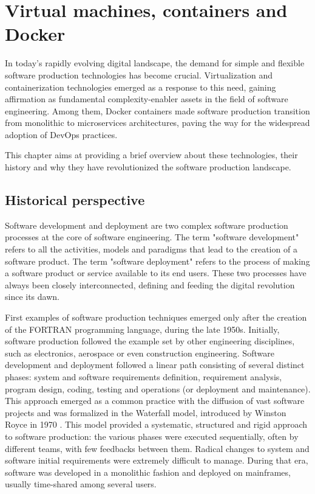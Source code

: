 \chapter{Virtual machines, containers and Docker}

In today's rapidly evolving digital landscape, the demand for simple and flexible software production technologies has become crucial. 
Virtualization and containerization technologies emerged as a response to this need, gaining affirmation as fundamental complexity-enabler assets in the field of software engineering.
Among them, Docker containers made software production transition from monolithic to microservices architectures, paving the way for the widespread adoption of DevOps practices. 

This chapter aims at providing a brief overview about these technologies, their history and why they have revolutionized the software production landscape.

\newpage

\section{Historical perspective}

Software development and deployment are two complex software production processes at the core of software engineering. 
The term "software development" refers to all the activities, models and paradigms that lead to the creation of a software product. The term "software deployment" refers to the process of making a software product or service available to its end users.
These two processes have always been closely interconnected, defining and feeding the digital revolution since its dawn.

First examples of software production techniques emerged only after the creation of the FORTRAN programming language, during the late 1950s.   
Initially, software production followed the example set by other engineering disciplines, such as electronics, aerospace or even construction engineering. 
Software development and deployment followed a linear path consisting of several distinct phases: system and software requirements definition, requirement analysis, program design, coding, testing and operations (or deployment and maintenance).
This approach emerged as a common practice with the diffusion of vast software projects and was formalized in the Waterfall model, introduced by Winston Royce in 1970 \cite{royce1987managing}.
This model provided a systematic, structured and rigid approach to software production: the various phases were executed sequentially, often by different teams, with few feedbacks between them. Radical changes to system and software initial requirements were extremely difficult to manage.
During that era, software was developed in a monolithic fashion and deployed on mainframes, usually time-shared among several users. 

